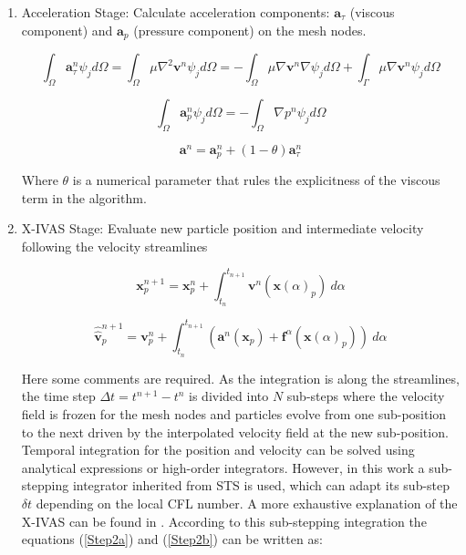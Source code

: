 \begin{enumerate}
  \item Acceleration Stage: Calculate acceleration components: $\mathbf{a}_{\tau}$ (viscous component) and $\mathbf{a}_{p}$ (pressure component) on the mesh nodes.


  \begin{equation}\label{Step1a}
\int_{\Omega}\mathbf{a}^{n}_{\tau}\psi_j d\Omega=\int_{\Omega}\mu \nabla^{2}\mathbf{v}^{n} \psi_j d\Omega=-\int_{\Omega}\mu \nabla\mathbf{v}^{n} \nabla \psi_j d\Omega + \int_{\Gamma}\mu \nabla\mathbf{v}^{n} \psi_j d\Omega
\end{equation}

\begin{equation}\label{Step1b}
\int_{\Omega}\mathbf{a}^{n}_{p}\psi_j d\Omega=-\int_{\Omega}\nabla p^{n} \psi_j d\Omega
\end{equation}

\begin{equation}\label{Step1c}
\mathbf{a}^{n}=\mathbf{a}^{n}_{p} + (1-\theta)\mathbf{a}^{n}_{\tau}
\end{equation}

Where $\theta$ is a numerical parameter that rules the explicitness of the viscous term in the algorithm.

  \item X-IVAS Stage: Evaluate new particle position and intermediate velocity following the velocity streamlines

  \begin{equation}\label{Step2a}
\mathbf{x}^{n+1}_{p}=\mathbf{x}^{n}_{p} + \int_{t_n}^{t_{n+1}} \mathbf{v}^{n}(\mathbf{x}(\alpha)_{p}) \ d\alpha
\end{equation}

\begin{equation}\label{Step2b}
\displaystyle \widehat{\widehat{\mathbf{v}}}^{n+1}_{p}=\mathbf{v}^{n}_{p} +
\int_{t_n}^{t_{n+1}} \left( \mathbf{a}^{n}(\mathbf{x}_{p}) + \mathbf{f}^{\alpha} (\mathbf{x}(\alpha)_{p}) \right)
 \ d\alpha
\end{equation}

Here some comments are required. As the integration is along the streamlines, the time step $\Delta t=t^{n+1}-t^{n}$ is divided into $N$ sub-steps where the velocity field is frozen for the mesh nodes and particles evolve from one sub-position to the next driven by the interpolated velocity field at the new sub-position. Temporal integration for the position and velocity can be solved using analytical expressions\cite{Nigro11} or high-order integrators\cite{Nair2003275}. However, in this work a sub-stepping integrator inherited from STS\cite{Alexiades96} is used, which can adapt its sub-step $\delta t$ depending on the local CFL number. A more exhaustive explanation of the X-IVAS can be found in \cite{Nigro11}. According to this sub-stepping integration the equations (\ref{Step2a}) and (\ref{Step2b}) can be written as:


\end{enumerate}
